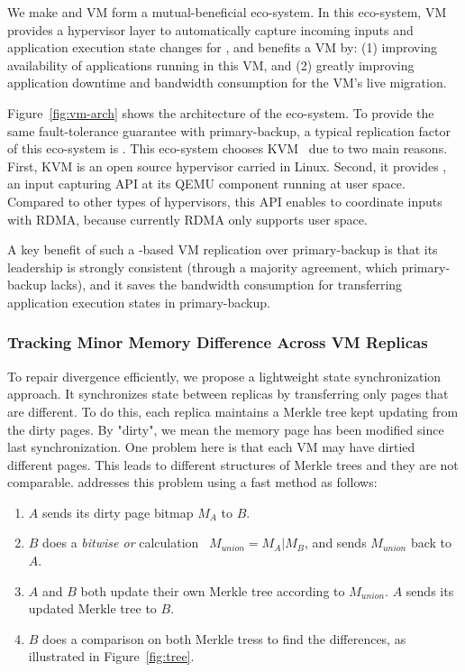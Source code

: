 We make \falcon and VM form a mutual-beneficial eco-system. In this eco-system, 
VM provides a hypervisor layer to automatically capture incoming inputs and 
application execution state changes for \falcon, and \falcon benefits a VM by: 
(1) improving availability of applications running in this VM, and (2) greatly 
improving application downtime and bandwidth consumption for the VM's live 
migration.

Figure~\ref{fig:vm-arch} shows the architecture of the eco-system. To provide 
the same fault-tolerance guarantee with primary-backup, a typical replication 
factor of this eco-system is . This eco-system chooses KVM~\cite{kvm} 
due to two main reasons. First, KVM is an open source hypervisor carried in 
Linux. Second, it provides , an input capturing API at its QEMU 
component running at user space. Compared to other types of hypervisors, this 
API enables \falcon to coordinate inputs with RDMA, because currently RDMA only 
supports user space.

A key benefit of such a \paxos-based VM replication over primary-backup is that 
its leadership is strongly consistent (through a majority agreement, which 
primary-backup lacks), and it saves the bandwidth consumption for transferring 
application execution states in primary-backup.

\vspace{-.15in}\subsubsection{Tracking Minor Memory Difference Across VM 
Replicas}
\label{sec:workflow}\vspace{-.075in}

To repair divergence efficiently, we propose a lightweight state synchronization 
approach. It synchronizes state between replicas by transferring only pages 
that are different. To do this, each replica maintains a Merkle tree kept 
updating from the dirty pages. By "dirty", we mean the memory page has been 
modified since last synchronization. One problem here is that each VM may have 
dirtied different pages. This leads to different structures of Merkle trees and 
they are not comparable. \xxx addresses this problem using a fast method as 
follows:

\begin{enumerate}
\item $A$ sends its dirty page bitmap $M_A$ to $B$.
\item $B$ does a \textit{bitwise or} calculation \ $M_{union} = M_A | M_B $, 
and sends $M_{union}$ back to $A$.
\item $A$ and $B$ both update their own Merkle tree according to $M_{union}$. 
$A$ sends its updated Merkle tree to $B$. 
\item $B$ does a comparison on both Merkle tress to find the differences, as 
illustrated in Figure~\ref{fig:tree}.
\end{enumerate}

